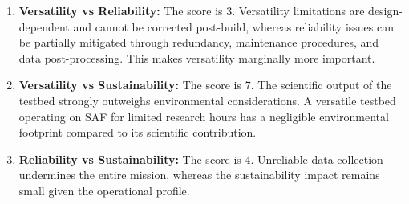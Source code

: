 \begin{enumerate}
    \item \textbf{Versatility vs Reliability:} The score is 3. Versatility limitations are design-dependent and cannot be corrected post-build, whereas reliability issues can be partially mitigated through redundancy, maintenance procedures, and data post-processing. This makes versatility marginally more important.
    \item \textbf{Versatility vs Sustainability:} The score is 7. The scientific output of the testbed strongly outweighs environmental considerations. A versatile testbed operating on SAF for limited research hours has a negligible environmental footprint compared to its scientific contribution.
    \item \textbf{Reliability vs Sustainability:} The score is 4. Unreliable data collection undermines the entire mission, whereas the sustainability impact remains small given the operational profile.
\end{enumerate}




